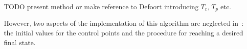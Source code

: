 \documentclass[eprint]{actapoly}
\begin{document}
TODO present method or make reference to Defoort introducing $T_c$, $T_p$ etc.

However, two aspects of the implementation of this algorithm are neglected in~\cite{Defoort2007a}: the initial values for
the control points and the procedure for reaching a desired final state.

%
%






\end{document}
